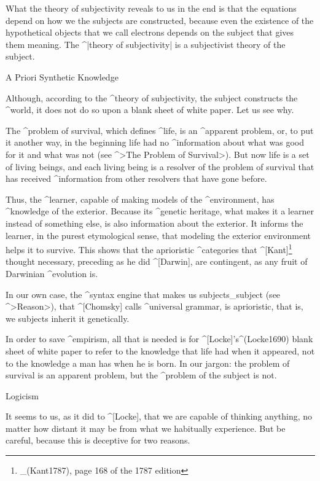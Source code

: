 What the theory of subjectivity reveals to us in the end is that the
equations depend on how we the subjects are constructed, because even
the existence of the hypothetical objects that we call electrons depends
on the subject that gives them meaning. The ^|theory of subjectivity| is
a subjectivist theory of the subject.


\Section A Priori Synthetic Knowledge

Although, according to the ^{theory of subjectivity}, the subject
constructs the ^{world}, it does not do so upon a blank sheet of white
paper. Let us see why.

The ^{problem of survival}, which defines ^{life}, is an ^{apparent
problem}, or, to put it another way, in the beginning life had no
^{information} about what was good for it and what was not (see ^>The
Problem of Survival>). But now life is a set of living beings, and each
living being is a resolver of the problem of survival that has received
^{information} from other resolvers that have gone before.

Thus, the ^{learner}, capable of making models of the ^{environment},
has  ^{knowledge} of the exterior. Because its
^{genetic} heritage, what makes it a learner instead of something else,
is also information about the exterior. It informs the learner, in the
purest etymological sense, that modeling the exterior environment helps
it to survive. This shows that the aprioristic ^{categories} that
^[Kant]\footnote{_(Kant1787), page 168 of the 1787 edition} thought
necessary, preceding as he did ^[Darwin], are contingent, as any fruit
of Darwinian ^{evolution} is.

In our own case, the ^{syntax engine} that makes us subjects_{subject}
(see ^>Reason>), that ^[Chomsky] calls ^{universal grammar}, is
aprioristic, that is, we subjects inherit it genetically.

In order to save ^{empirism}, all that is needed is for
^[Locke]'s^(Locke1690) blank sheet of white paper to refer to the
knowledge that life had when it appeared, not to the knowledge a man has
when he is born. In our jargon: the problem of survival is an apparent
problem, but the ^{problem of the subject} is not.


\Section Logicism

It seems to us, as it did to ^[Locke], that we are capable of thinking
anything, no matter how distant it may be from what we habitually
experience. But be careful, because this is deceptive for two reasons.

